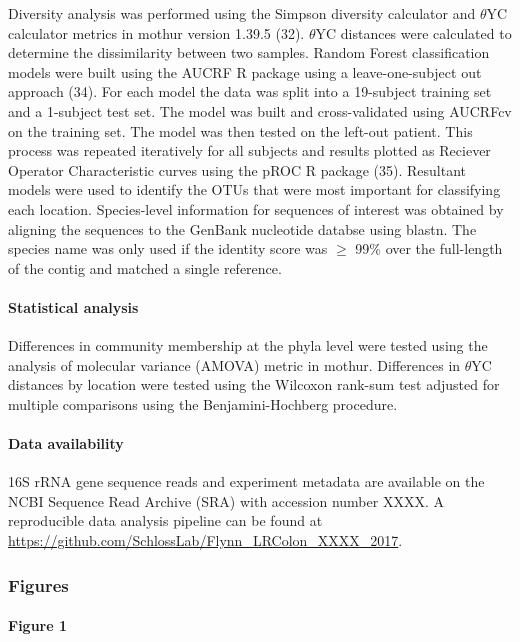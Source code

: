 \documentclass[12pt,]{article}
\let\oldparagraph\paragraph
\renewcommand{\paragraph}[1]{\oldparagraph{#1}\mbox{}}
\begin{document}
Diversity analysis was performed using the Simpson diversity calculator
and \(\theta\)YC calculator metrics in mothur version 1.39.5 (32).
\(\theta\)YC distances were calculated to determine the dissimilarity
between two samples. Random Forest classification models were built
using the AUCRF R package using a leave-one-subject out approach (34).
For each model the data was split into a 19-subject training set and a
1-subject test set. The model was built and cross-validated using
AUCRFcv on the training set. The model was then tested on the left-out
patient. This process was repeated iteratively for all subjects and
results plotted as Reciever Operator Characteristic curves using the
pROC R package (35). Resultant models were used to identify the OTUs
that were most important for classifying each location. Species-level
information for sequences of interest was obtained by aligning the
sequences to the GenBank nucleotide databse using blastn. The species
name was only used if the identity score was \(\ge\) 99\% over the
full-length of the contig and matched a single reference.

\paragraph{Statistical analysis}\label{statistical-analysis}

Differences in community membership at the phyla level were tested using
the analysis of molecular variance (AMOVA) metric in mothur. Differences
in \(\theta\)YC distances by location were tested using the Wilcoxon
rank-sum test adjusted for multiple comparisons using the
Benjamini-Hochberg procedure.

\paragraph{Data availability}\label{data-availability}

16S rRNA gene sequence reads and experiment metadata are available on
the NCBI Sequence Read Archive (SRA) with accession number XXXX. A
reproducible data analysis pipeline can be found at
\url{https://github.com/SchlossLab/Flynn_LRColon_XXXX_2017}.

\newpage

\subsubsection{Figures}\label{figures}

\paragraph{Figure 1}\label{figure-1}
\end{document}
